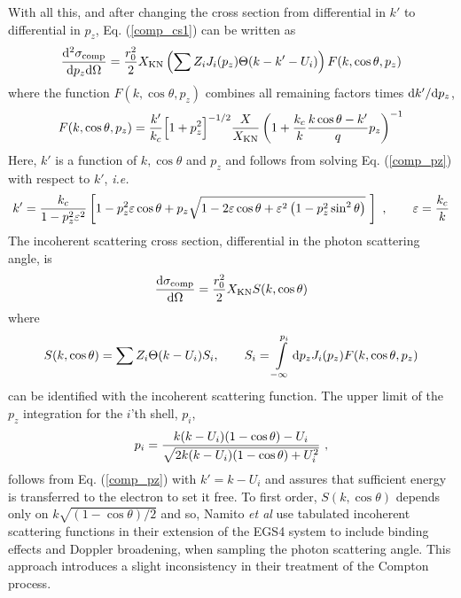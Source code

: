 With all this, and after changing the cross section 
from differential in $k'$ to differential in $p_z$, 
Eq. (\ref{comp_cs1}) can be written as
\begin{equation}
{{\rm d}^2 \sigma_{\rm comp} \over {\rm d}p_z {\rm d}\Omega} = 
{r_0^2 \over 2} X_{\rm KN} 
\left( \sum Z_i J_i(p_z) \Theta(k - k' - U_i) \right) F(k,\cos \theta, p_z)
\end{equation}
where the function $F(k,\cos \theta, p_z)$ combines all remaining 
factors times ${\rm d}k'/{\rm d}p_z$,
\begin{equation}
F(k,\cos \theta, p_z) = \frac{k'}{k_c} \Big[ 1 + p_z^2 \Big]^{-1/2} 
\frac{X}{X_{\rm KN}} \left(1 + \frac{k_c}{k} {k \cos \theta - k' \over q} p_z 
\right)^{-1}
\end{equation} 
Here, $k'$ is a function of $k, \cos \theta$ and $p_z$ and 
follows from solving Eq. (\ref{comp_pz}) with respect to $k'$, 
{\em i.e.}
\begin{equation}
\label{comp_kprime}
k' = {k_c \over 1 - p_z^2 \varepsilon^2 } \left[ 
1 - p_z^2 \varepsilon \cos \theta + p_z \sqrt{1 - 2 \varepsilon 
\cos \theta + \varepsilon^2 \left(1 - p_z^2 \sin^2 \theta \right) }~ \right]~,
\quad \quad \varepsilon = \frac{k_c}{k}
\end{equation}
The incoherent scattering cross section, differential in 
the photon scattering angle, is 
\begin{equation}
\label{comp_sig_omega}
{{\rm d} \sigma_{\rm comp} \over {\rm d}\Omega} =
{r_0^2 \over 2} 
X_{\rm KN} S(k,\cos \theta)
\end{equation}
where
\begin{equation}
\label{comp_sincoh}
S(k,\cos \theta) =  
\sum Z_i \Theta(k - U_i) S_i, \quad \quad 
S_i = \int\limits_{-\infty}^{p_i} {\rm d} p_z J_i(p_z) 
F(k,\cos \theta, p_z)
\end{equation}
can be identified with the incoherent scattering function. 
The upper limit of the $p_z$ integration for the $i$'th shell, $p_i$,
\begin{equation}
\label{comp_pi}
p_i = { k (k - U_i) (1 - \cos \theta) - U_i \over 
\sqrt{ 2 k (k - U_i) (1 - \cos \theta) + U_i^2}}~,
\end{equation}
follows from Eq. (\ref{comp_pz}) with 
$k' = k - U_i$ and assures that sufficient energy is transferred 
to the electron to set it free. To first order, $S(k,\cos \theta)$ 
depends only on $k \sqrt{(1 - \cos \theta)/2}$ and so, 
Namito {\em et al} \cite{Na94} use tabulated 
incoherent scattering functions in their 
extension of the EGS4 system to include binding effects
and Doppler broadening, when sampling the photon scattering angle. 
This approach introduces a slight inconsistency in their treatment 
of the Compton process. 

